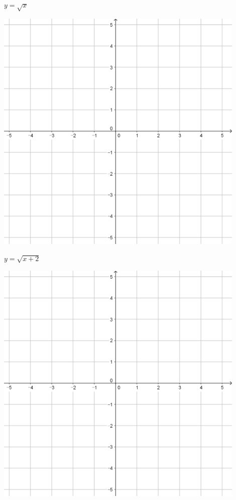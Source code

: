 \documentclass{oblivoir}
\begin{document}
\clearpage
\begin{minipage}{0.45\textwidth}\centering
\(y=\sqrt x\)
\par\bigskip\includegraphics[width=0.9\textwidth]{55}
\end{minipage}
\begin{minipage}{0.45\textwidth}\centering
\(y=\sqrt{x+2}\)
\par\bigskip\includegraphics[width=0.9\textwidth]{55}
\end{minipage}\bigskip\bigskip\par
\end{document}
